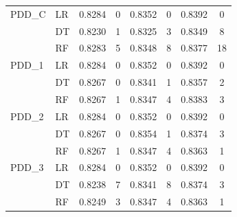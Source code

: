 \begin{table}[h]
\begin{tabular}{llcccccc}
    \midrule
    PDD\_C   & LR & 0.8284 & 0 & 0.8352 & 0 & 0.8392 & 0 \\
             & DT & 0.8230 & 1 & 0.8325 & 3 & 0.8349 & 8 \\
             & RF & 0.8283 & 5 & 0.8348 & 8 & 0.8377 & 18 \\
    \midrule
    PDD\_1   & LR & 0.8284 & 0 & 0.8352 & 0 & 0.8392 & 0 \\
             & DT & 0.8267 & 0 & 0.8341 & 1 & 0.8357 & 2 \\
             & RF & 0.8267 & 1 & 0.8347 & 4 & 0.8383 & 3 \\
    \midrule
    PDD\_2   & LR & 0.8284 & 0 & 0.8352 & 0 & 0.8392 & 0 \\
             & DT & 0.8267 & 0 & 0.8354 & 1 & 0.8374 & 3 \\
             & RF & 0.8267 & 1 & 0.8347 & 4 & 0.8363 & 1 \\
    \midrule
    PDD\_3   & LR & 0.8284 & 0 & 0.8352 & 0 & 0.8392 & 0 \\
             & DT & 0.8238 & 7 & 0.8341 & 8 & 0.8374 & 3 \\
             & RF & 0.8249 & 3 & 0.8347 & 4 & 0.8363 & 1 \\
    \bottomrule
    \end{tabular}
\end{table}

